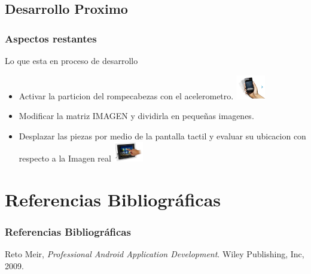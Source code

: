 \documentclass[serif,11pt]{beamer}
\begin{document}
	\subsection{Desarrollo Proximo}
		\begin{frame}
			\frametitle{Aspectos restantes}

			\begin{block}{Lo que esta en proceso de desarrollo}

						\begin{itemize}
							 \pause
							\item Activar la particion del rompecabezas con el acelerometro.
							\includegraphics[width=0.1\textwidth]{shake} 
							\bigskip
							\pause
							\item Modificar la matriz IMAGEN y dividirla en pequeñas imagenes.

							\bigskip
							\pause
							\item Desplazar las piezas por medio de la pantalla tactil y evaluar su ubicacion con respecto a la Imagen real
							\includegraphics[width=0.1\textwidth]{touch} 
							\bigskip

						\end{itemize}
			\end{block}

		\end{frame}

	\section{Referencias Bibliogr\'aficas} 

		\begin{frame}\frametitle<presentation>{Referencias Bibliogr\'aficas}


			\begin{thebibliography}{10}

				\bibitem{lamport94}
					  Reto Meir, 
   					\emph{Professional Android Application Development}.
 					 Wiley Publishing, Inc,
  					  2009.

			\end{thebibliography}
		\end{frame}
\end{document}
